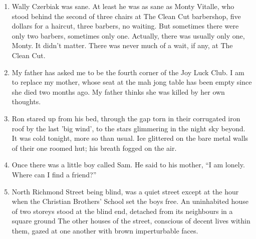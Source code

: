 \documentclass[11pt]{article}
\begin{document}
\begin{enumerate}
\item Wally Czerbiak was sane. At least he was as sane as Monty Vitalle, who stood behind the second of three chairs at The Clean Cut barbershop, five dollars for a haircut, three barbers, no waiting. But sometimes there were only two barbers, sometimes only one. Actually, there was usually only one, Monty. It didn't matter. There was never much of a wait, if any, at The Clean Cut.

\item My father has asked me to be the fourth corner of the Joy Luck Club. I am
to replace my mother, whose seat at the mah jong table has been empty since
she died two months ago. My father thinks she was killed by her own
thoughts.

\item Ron stared up from his bed, through the gap torn in their corrugated iron
roof by the last 'big wind', to the stars glimmering in the night sky
beyond. It was cold tonight, more so than usual. Ice glittered on the bare
metal walls of their one roomed hut; his breath fogged on the air.

\item Once there was a little boy called Sam. He said to his mother, ``I am
lonely. Where can I find a friend?''
\item North Richmond Street being blind, was a quiet street except at the hour when the Christian Brothers' School set the boys free. An uninhabited house of two storeys stood at the blind end, detached from its neighbours in a square ground The other houses of the street, conscious of decent lives within them, gazed at one another with brown imperturbable faces. 
\end{enumerate}
\end{document}
